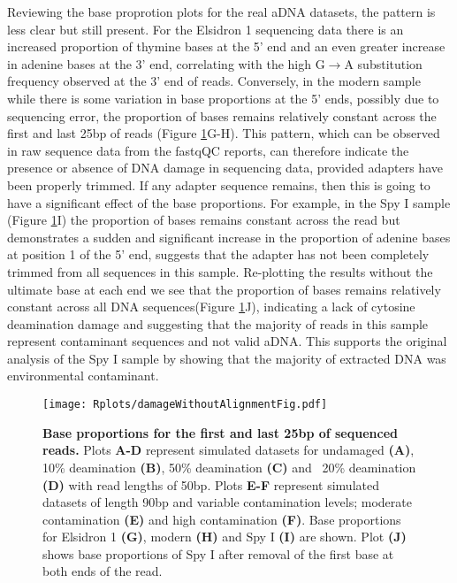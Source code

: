 \documentclass[12pt, a4paper]{article}
\begin{document}
Reviewing the base proprotion plots for the real aDNA datasets, the pattern is less clear but still present. 
For the Elsidron 1 sequencing data there is an increased proportion of thymine bases at the 5' end and an even greater increase in adenine bases at the 3' end, correlating with the high G$\to$A substitution frequency observed at the 3' end of reads.
Conversely, in the modern sample while there is some variation in base proportions at the 5' ends, possibly due to sequencing error, the proportion of bases remains relatively constant across the first and last 25bp of reads (Figure \ref{fig:damageWithoutAlignment}G-H).
This pattern, which can be observed in raw sequence data from the fastqQC reports, can therefore indicate the presence or absence of DNA damage in sequencing data, provided adapters have been properly trimmed.
If any adapter sequence remains, then this is going to have a significant effect of the base proportions.
For example, in the Spy I sample (Figure \ref{fig:damageWithoutAlignment}I) the proportion of bases remains constant across the read but demonstrates a sudden and significant increase in the proportion of adenine bases at position 1 of the 5' end, suggests that the adapter has not been completely trimmed from all sequences in this sample.
Re-plotting the results without the ultimate base at each end we see that the proportion of bases remains relatively constant across all DNA sequences(Figure \ref{fig:damageWithoutAlignment}J), indicating a lack of cytosine deamination damage and suggesting that the majority of reads in this sample represent contaminant sequences and not valid aDNA.
This supports the original analysis of the Spy I sample by  showing that the majority of extracted DNA was environmental contaminant.

\begin{figure}[ht!]
	\begin{center}
	\texttt{[image: Rplots/damageWithoutAlignmentFig.pdf]}
	\end{center}
	\small\caption[Base proportions for the first and last 25bp of sequenced reads]{\textbf{Base proportions for the first and last 25bp of sequenced reads.} Plots \textbf{A-D} represent simulated datasets for undamaged \textbf{(A)}, 10\% deamination \textbf{(B)}, 50\% deamination \textbf{(C)} and ~20\% deamination \textbf{(D)} with read lengths of 50bp. Plots \textbf{E-F} represent simulated datasets of length 90bp and variable contamination levels; moderate contamination \textbf{(E)} and high contamination \textbf{(F)}. Base proportions for Elsidron 1 \textbf{(G)}, modern \textbf{(H)} and Spy I \textbf{(I)} are shown. Plot \textbf{(J)} shows base proportions of Spy I after removal of the first base at both ends of the read. }\label{fig:damageWithoutAlignment}
\end{figure}
\clearpage
\end{document}
